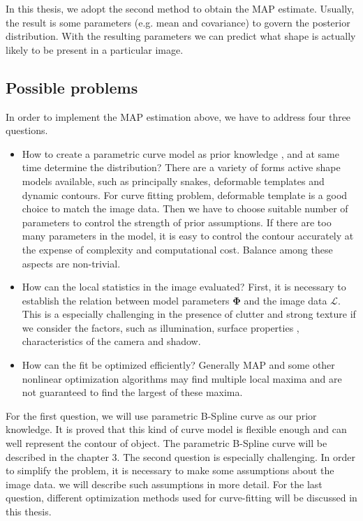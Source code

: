 In this thesis, we adopt the second method to obtain the MAP estimate.
Usually, the result is some parameters (e.g. mean and covariance) to
govern the posterior distribution. With the resulting parameters we
can predict what shape is actually likely to be present in a particular image.


\subsection{Possible problems}
\label{sec:prob}
In order to implement the MAP estimation above, we have to address
four three questions.

\begin{itemize}
\item How to create a parametric curve model as prior knowledge , and
  at same time determine the distribution? There are a variety of
  forms active shape models available, such as principally snakes,
  deformable templates and dynamic contours. For curve fitting
  problem, deformable template is a good choice to match the image
  data. Then we have to choose suitable number of parameters to control
  the strength of prior assumptions. If there are too many parameters
  in the model, it is easy to control the contour accurately at the
  expense of complexity and computational cost. Balance among these
  aspects are non-trivial.

\item How can the local statistics in the image evaluated? First, it
  is necessary to establish the relation between model parameters
  $\mathbf{\Phi}$ and the image data $\mathcal{L}$. This is a especially
challenging in the presence of clutter and strong texture if we
consider the factors, such as  illumination, surface properties ,
characteristics of the camera and shadow. 

\item How can the fit be optimized efficiently? Generally MAP and some
  other nonlinear optimization algorithms may find multiple local maxima and are not guaranteed to find the
  largest of these maxima.
\end{itemize}


For the first question, we will use parametric B-Spline curve as
our prior knowledge. It is proved that this kind of curve model is
flexible enough and can well represent the contour of object. The
parametric B-Spline curve will be described in the chapter 3.
The second question is especially challenging. In order to simplify
the problem, it is necessary to make some assumptions about the image
data. we will describe such assumptions in more detail. For the last
question, different optimization methods used for curve-fitting will
be discussed in this thesis.

